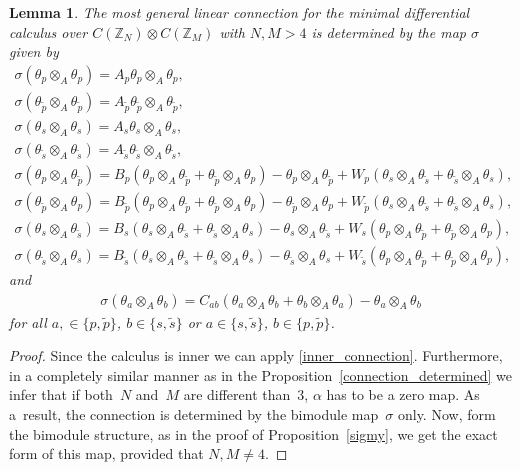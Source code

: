 \documentclass[10pt,a4paper]{amsart}
\numberwithin{equation}{section}
\newtheorem{Lemma}[Theorem]{Lemma}
\newcommand{\Z}{\mathbb{Z}}
\newcommand{\ip}{{\tilde{p}}}
\newcommand{\is}{{\tilde{s}}}
\begin{document}
\begin{Lemma}The most general linear connection for the minimal differential calculus over
$C(\Z_N) \otimes C(\Z_M)$ with $N,M>4$ is determined by the map $\sigma$ given by
\begin{gather*}
\sigma(\theta_p \otimes_A \theta_p) = A_p \theta_p \otimes_A \theta_p, \\
\sigma(\theta_\ip \otimes_A \theta_\ip) = A_\ip \theta_\ip \otimes_A \theta_\ip, \\
\sigma(\theta_s \otimes_A \theta_s) = A_s \theta_s \otimes_A \theta_s, \\
\sigma(\theta_\is \otimes_A \theta_\is) = A_\is \theta_\is \otimes_A \theta_\is, \\
\sigma(\theta_p \otimes_A \theta_\ip) = B_p \left( \theta_p \otimes_A \theta_\ip + \theta_\ip \otimes_A \theta_p \right) - \theta_p \otimes_A \theta_\ip + W_{p} (\theta_s\otimes_A\theta_{\is}+\theta_{\is}\otimes_A\theta_s), \\
\sigma(\theta_\ip \otimes_A \theta_p) = B_\ip \left( \theta_p \otimes_A \theta_\ip + \theta_\ip \otimes_A \theta_p \right) - \theta_\ip \otimes_A \theta_p + W_{\ip} (\theta_s\otimes_A\theta_{\is}+\theta_{\is}\otimes_A\theta_s), \\
\sigma(\theta_s \otimes_A \theta_\is) = B_s \left( \theta_s \otimes_A \theta_\is + \theta_\is \otimes_A \theta_s \right) - \theta_s \otimes_A \theta_\is + W_{s} (\theta_p\otimes_A\theta_{\ip}+\theta_{\ip}\otimes_A\theta_p), \\
\sigma(\theta_\is \otimes_A \theta_s) = B_\is \left( \theta_s \otimes_A \theta_\is + \theta_\is \otimes_A \theta_s \right) - \theta_\is \otimes_A \theta_s + W_{\is} (\theta_p\otimes_A\theta_{\ip}+\theta_{\ip}\otimes_A\theta_p),
\end{gather*}
and
\begin{gather*}
 \sigma(\theta_a \otimes_A \theta_b) = C_{ab} (\theta_a\otimes_A\theta_b+\theta_b\otimes_A\theta_a)-\theta_a\otimes_A\theta_b
\end{gather*}
for all $a,\in\{p,\ip \}$, $b \in \{ s,\is\}$ or $ a \in \{ s,\is\}$, $b \in\{p,\ip \}$.
\end{Lemma}
\begin{proof}Since the calculus is inner we can apply \eqref{inner_connection}. Furthermore, in a completely similar manner as in the Proposition~\ref{connection_determined} we infer that if both~$N$ and~$M$ are different than~$3$, $\alpha$ has to be a zero map. As a~result, the connection is determined by the bimodule map~$\sigma$ only. Now, form the bimodule structure, as in the proof of Proposition~\ref{sigmy}, we get the exact form of this map, provided that $N,M\neq 4$.
\end{proof}
\end{document}
